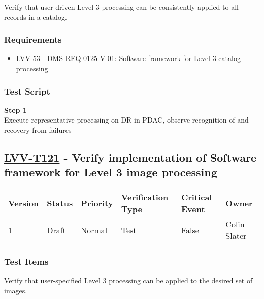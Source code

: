Verify that user-driven Level 3 processing can be consistently applied
to all records in a catalog.

\subsubsection{Requirements}\label{requirements}

\begin{itemize}
\tightlist
\item
  \href{https://jira.lsstcorp.org/browse/LVV-53}{LVV-53} -
  DMS-REQ-0125-V-01: Software framework for Level 3 catalog processing
\end{itemize}

\subsubsection{Test Script}\label{test-script}

\textbf{Step 1}\\
Execute representative processing on DR in PDAC, observe recognition of
and recovery from failures\\[2\baselineskip]

\hypertarget{lvv-t121---verify-implementation-of-software-framework-for-level-3-image-processing}{\subsection{\texorpdfstring{\href{https://jira.lsstcorp.org/secure/Tests.jspa\#/testCase/LVV-T121}{LVV-T121}
- Verify implementation of Software framework for Level 3 image
processing}{LVV-T121 - Verify implementation of Software framework for Level 3 image processing}}\label{lvv-t121---verify-implementation-of-software-framework-for-level-3-image-processing}}

\begin{longtable}[]{@{}llllll@{}}
\toprule
Version & Status & Priority & Verification Type & Critical Event &
Owner\tabularnewline
\midrule
\endhead
1 & Draft & Normal & Test & False & Colin Slater\tabularnewline
\bottomrule
\end{longtable}

\subsubsection{Test Items}\label{test-items-1}

Verify that user-specified Level 3 processing can be applied to the
desired set of images.

